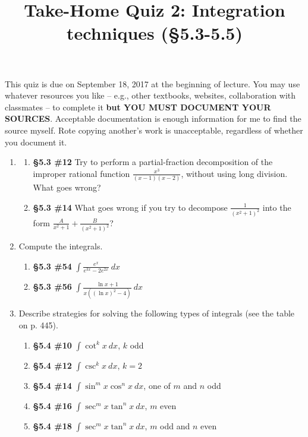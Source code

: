 \documentclass[%
]{article}
\title{\vspace{-3.5pc} 
	\flushleft \bf \Large Take-Home Quiz 2:  Integration techniques  %
	 (\S5.3-5.5)}
\date{}
\begin{document}
\maketitle

\vspace{-3pc}
 This quiz is due on September 18, 2017 at the beginning of lecture.  You may use whatever resources you like -- e.g., other textbooks, websites, collaboration with classmates -- to complete it \textbf{but YOU MUST DOCUMENT YOUR SOURCES}.  Acceptable documentation is enough information for me to find the source myself.  Rote copying another's work is unacceptable, regardless of whether you document it.  

\noindent\hrulefill

\begin{enumerate}
\item \begin{enumerate}
	\item {\bf \S5.3 \#12} Try to perform a partial-fraction decomposition of the improper rational function $\displaystyle\frac{x^3}{(x-1)(x-2)}$, without using long division.  What goes wrong?
	\item {\bf \S5.3 \#14} What goes wrong if you try to decompose $\displaystyle\frac{1}{(x^2+1)^2}$ into the form $\displaystyle\frac{A}{x^2+1}+\frac{B}{(x^2+1)^2}$?
	\end{enumerate}

\item Compute the integrals.
	\begin{enumerate}
	\item {\bf \S5.3 \#54} $\displaystyle\int\frac{e^x}{e^{3x}-2e^{2x}}\ dx$
	\item {\bf \S5.3 \#56} $\displaystyle\int\frac{\ln x+1}{x\left((\ln x)^2-4\right)}\ dx$
	\end{enumerate}
	
\item Describe strategies for solving the following types of integrals (see the table on p. 445).
	\begin{enumerate}
	\item {\bf \S5.4 \#10} $\int\cot^kx\ dx$, $k$ odd
	\item {\bf \S5.4 \#12} $\int\csc^kx\ dx$, $k=2$
	\item {\bf \S5.4 \#14} $\int\sin^mx\cos^nx\ dx$, one of $m$ and $n$ odd
	\item {\bf \S5.4 \#16} $\int\sec^mx\tan^nx\ dx$, $m$ even
	\item {\bf \S5.4 \#18} $\int\sec^mx\tan^nx\ dx$, $m$ odd and $n$ even
	\end{enumerate}


\end{enumerate}
\end{document}
